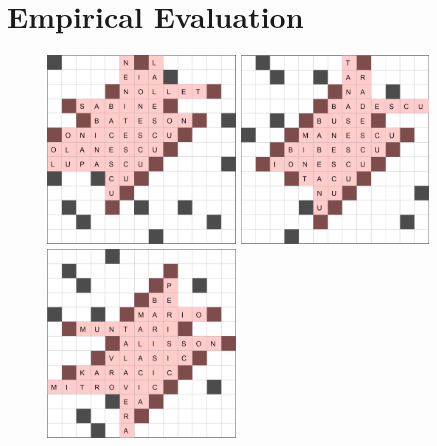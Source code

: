 \section{Empirical Evaluation}


\begin{figure}[th]
\centering






\includegraphics[height=5cm]{2013a.png}
%
\hspace{1cm}
%
\includegraphics[height=5cm]{2021a.png}
%
\hspace{1cm}
%
\includegraphics[height=5cm]{2023a.png}


\end{figure}
